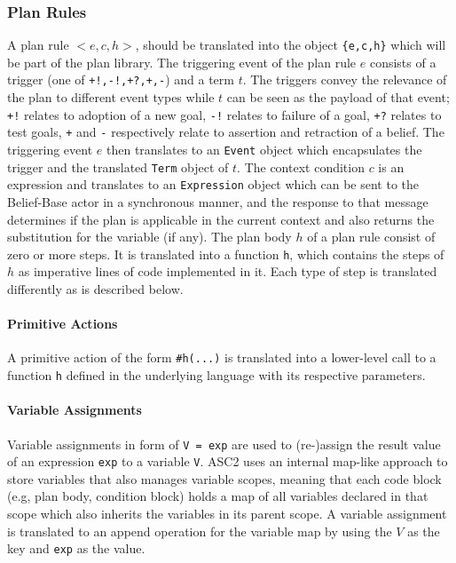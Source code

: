 \subsubsection{Plan Rules}
A plan rule $<e,c,h>$, should be translated into the object \verb+{e,c,h}+ which will be part of the plan library. The triggering event of the plan rule $e$ consists of a trigger (one of \verb#+!,-!,+?,+,-#) and a term $t$. The triggers convey the relevance of the plan to different event types while $t$ can be seen as the payload of that event; \verb#+!# relates to adoption of a new goal, \verb#-!# relates to failure of a goal, \verb#+?# relates to test goals, \verb#+# and \verb#-# respectively relate to assertion and retraction of a belief. The triggering event $e$ then translates to an \verb+Event+ object which encapsulates the trigger and the translated \verb+Term+ object of $t$. The context condition $c$ is an expression and translates to an \verb+Expression+ object which can be sent to the Belief-Base actor in a synchronous manner, and the response to that message determines if the plan is applicable in the current context and also returns the substitution for the variable (if any). The plan body $h$ of a plan rule consist of zero or more steps. %
It is translated into a function \verb+h+, which contains the steps of $h$ as imperative lines of code implemented in it. Each type of step is translated differently as is described below.



\paragraph{Primitive Actions}
A primitive action of the form \verb+#h(...)+ %
is translated into a lower-level call to a function \verb+h+ defined in the underlying language with its respective parameters. %

\paragraph{Variable Assignments}
Variable assignments in form of \verb+V = exp+ are used to (re-)assign the result value of an expression \verb+exp+ to a variable \verb+V+. ASC2 uses an internal map-like approach to store variables that also manages variable scopes, meaning that each code block (e.g, plan body, condition block) holds a map of all variables declared in that scope which also inherits the variables in its parent scope. A variable assignment is translated to an append operation for the variable map by using the $V$ as the key and \verb+exp+ as the value.

